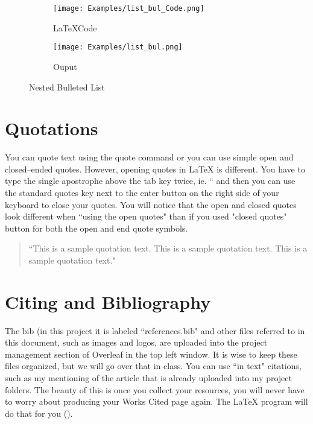 \documentclass[10pt]{article}
\begin{document}
\begin{figure}[ht]
\centering

\begin{subfigure}[t]{0.3\textwidth}
  \raggedright
  \texttt{[image: Examples/list\_bul\_Code.png]}
  \caption{\LaTeX Code}
  \label{fig:list_ex2.1}
\end{subfigure}
\vrule width 1pt
\begin{subfigure}[t]{0.3\textwidth}
  \raggedleft
  \texttt{[image: Examples/list\_bul.png]}
  \caption{Ouput}
  \label{fig:list_ex2.2}
\end{subfigure}

\caption{Nested Bulleted List}
\label{fig:list_ex2}
\end{figure}

\newpage
\section*{Quotations}
You can quote text using the quote command or you can use simple open and closed--ended quotes. However, opening quotes in \LaTeX{} is different. You have to type the single apostrophe above the tab key twice, ie. `` and then you can use the standard quotes key next to the enter button on the right side of your keyboard to close your quotes. You will notice that the open and closed quotes look different when ``using the open quotes" than if you used "closed quotes" button for both the open and end quote symbols. 

\begin{quote}
    ``This is a sample quotation text. This is a sample quotation text. This is a sample quotation text."
\end{quote}

\section*{Citing and Bibliography}
The bib (in this project it is labeled ``references.bib" and other files referred to in this document, such as images and logos, are uploaded into the project management section of Overleaf in the top left window. It is wise to keep these files organized, but we will go over that in class. You can use ``in text" citations, such as my mentioning of the \textcite{ramirez_mobilizing_2013} article that is already uploaded into my project folders. The beauty of this is once you collect your resources, you will never have to worry about producing your Works Cited page again. The \LaTeX{} program will do that for you (\cite{barreto_isi_2007}). 
\end{document}
